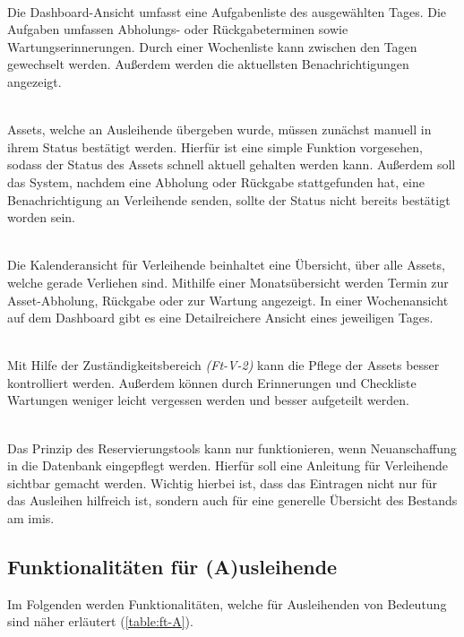 {\sffamily\color{maincolor}{Ft-V-1 | Dashboard }}\\
Die Dashboard-Ansicht umfasst eine Aufgabenliste des ausgewählten Tages. Die Aufgaben umfassen
Abholungs- oder Rückgabeterminen sowie Wartungserinnerungen. Durch einer Wochenliste kann zwischen
den Tagen gewechselt werden. Außerdem werden die aktuellsten Benachrichtigungen angezeigt.



{\sffamily\color{maincolor}{Ft-V-2 | Bearbeiten des Assetstatus }}\\
Assets, welche an Ausleihende übergeben wurde, müssen zunächst manuell in ihrem Status bestätigt
werden. Hierfür ist eine simple Funktion vorgesehen, sodass der Status des Assets schnell aktuell
gehalten werden kann. Außerdem soll das System, nachdem eine Abholung oder Rückgabe stattgefunden
hat, eine Benachrichtigung an Verleihende senden, sollte der Status nicht bereits bestätigt worden
sein.

{\sffamily\color{maincolor}{Ft-B-4 | Kalenderansicht für Verleihende}}\\
Die Kalenderansicht für Verleihende beinhaltet eine Übersicht, über alle Assets, welche gerade
Verliehen sind. Mithilfe einer Monatsübersicht werden Termin zur Asset-Abholung, Rückgabe oder zur
Wartung angezeigt. In einer Wochenansicht auf dem Dashboard gibt es eine Detailreichere Ansicht eines
jeweiligen Tages.

    {\sffamily\color{maincolor}{Ft-V-3 | Pflege von Assets   }}\\
Mit Hilfe der Zuständigkeitsbereich \textit{(Ft-V-2)} kann die Pflege der Assets besser kontrolliert
werden. Außerdem können durch Erinnerungen und Checkliste Wartungen weniger leicht vergessen werden
und besser aufgeteilt werden.

    {\sffamily\color{maincolor}{Ft-V-4 | Pflege der Datenbank }}\\
Das Prinzip des Reservierungstools kann nur funktionieren, wenn Neuanschaffung in die Datenbank
eingepflegt werden. Hierfür soll eine Anleitung für Verleihende sichtbar gemacht werden. Wichtig
hierbei ist, dass das Eintragen nicht nur für das Ausleihen hilfreich ist, sondern auch für eine
generelle Übersicht des Bestands am \ac{imis}.

\subsection{Funktionalitäten für (A)usleihende}
Im Folgenden werden Funktionalitäten, welche für Ausleihenden von Bedeutung sind näher erläutert
(\ref{table:ft-A}).

